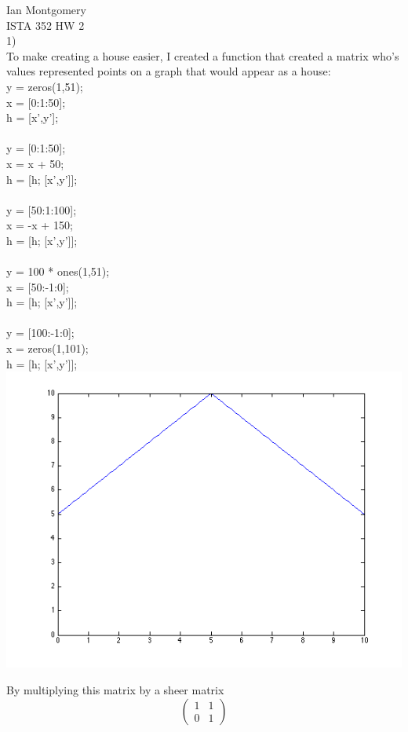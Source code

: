 \documentclass[a4paper,12pt]{article}
\begin{document}
Ian Montgomery\\
ISTA 352 HW 2\\

1)\\
To make creating a house easier, I created a function that created a matrix who's values represented points on a graph that would appear as a house:
\\
y = zeros(1,51);\\
x = [0:1:50];\\
h = [x',y'];\\
\\
y = [0:1:50];\\
x = x + 50;\\
h = [h; [x',y']];\\
\\
y = [50:1:100];\\
x = -x + 150;\\
h = [h; [x',y']];\\
\\
y = 100 * ones(1,51);\\
x = [50:-1:0];\\
h = [h; [x',y']];\\
\\
y = [100:-1:0];\\
x = zeros(1,101);\\
h = [h; [x',y']];\\

\includegraphics[scale = .5]{house.png}

By multiplying this matrix by a sheer matrix
\[ \left ( \begin{array}{cc}
1 & 1 \\
0 & 1 \end{array} \right) \]
\end{document}

